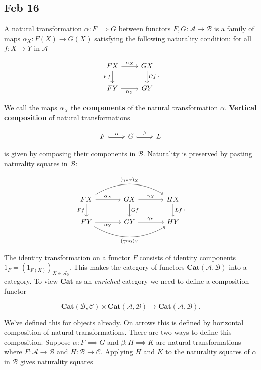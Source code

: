 \documentclass[11pt]{amsart}
\theoremstyle{plain}
\theoremstyle{definition}
\newcommand{\cA}{{\mathcal A}}
\newcommand{\cB}{{\mathcal B}}
\newcommand{\cC}{{\mathcal C}}
\newcommand{\Cat}{\mathbf{Cat}}
\newcommand{\noi}{{\noindent}}
\begin{document}
\subsection{Feb 16}

A natural transformation $\alpha : F \implies G$ between functors $F, G : \cA \to \cB$ is a family of maps $\alpha_X : F(X) \to G(X)$ satisfying the following naturality condition:  for all $f : X \to Y$ in $\cA$

\[ \begin{tikzcd}
  FX \rar["\alpha_X"] \dar["Ff"'] & GX \dar["Gf"] \\
FY \rar["\alpha_Y"'] & GY
\end{tikzcd}.\]

\noi We call the maps $\alpha_X$ the \textbf{components} of the natural transformation $\alpha$. \textbf{Vertical composition} of natural transformations 

\[ \begin{tikzcd}F \rar[Rightarrow, "\alpha"] &  G \rar[Rightarrow, "\beta"] &  L \end{tikzcd}\]

\noi is given by composing their components in $\cB$. Naturality is preserved by pasting naturality squares in $\cB$: 

\[ \begin{tikzcd}[column sep = large]
  FX \ar[rr, bend left, "(\gamma \circ \alpha)_X"] \dar["Ff"'] \rar["\alpha_X"]& GX \dar["Gf"] \rar["\gamma_X"]& HX \dar["Lf"] \\
F Y \ar[rr, bend right, "(\gamma\circ \alpha)_Y"'] \rar["\alpha_Y"'] & GY \rar["\gamma_Y"]& HY
\end{tikzcd}.\]

The identity transformation on a functor $F$ consists of identity components $1_F = (1_{F(X)})_{X \in \cA_0}$. This makes the category of functors $\Cat(\cA, \cB)$ into a category. To view $\Cat$ as an \textit{enriched} category we need to define a composition functor 

\[ \Cat(\cB, \cC) \times \Cat(\cA, \cB) \to \Cat(\cA,\cB).\]

\noi We've defined this for objects already. On arrows this is defined by horizontal composition of natural transformations. There are two ways to define this composition. Suppose $\alpha : F \implies G$ and $\beta : H \implies K$ are natural transformations where $F: \cA \to \cB$ and $H: \cB \to \cC$. Applying $H$ and $K$ to the naturality squares of $\alpha$ in $\cB$ gives naturality squares 
\end{document}

